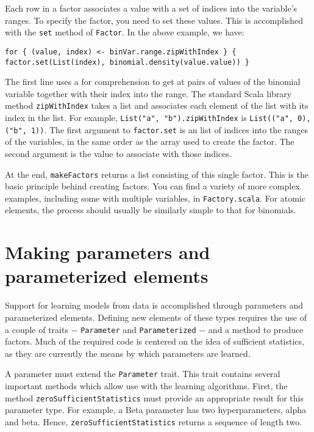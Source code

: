 Each row in a factor associates a value with a set of indices into the variable's ranges. To specify the factor, you need to set these values. This is accomplished with the \texttt{set} method of \texttt{Factor}. In the above example, we have:

\begin{flushleft}
\texttt{for \{ (value, index) <- binVar.range.zipWithIndex \} \{
\newline \tab factor.set(List(index), binomial.density(value.value))
\newline \}
}
\end{flushleft}

The first line uses a for comprehension to get at pairs of values of the binomial variable together with their index into the range. The standard Scala library method \texttt{zipWithIndex} takes a list and associates each element of the list with its index in the list. For example, \texttt{List("a", "b").zipWithIndex} is \texttt{List(("a", 0), ("b", 1))}. The first argument to \texttt{factor.set} is an list of indices into the ranges of the variables, in the same order as the array used to create the factor. The second argument is the value to associate with those indices.

At the end, \texttt{makeFactors} returns a list consisting of this single factor. This is the basic principle behind creating factors. You can find a variety of more complex examples, including some with multiple variables, in  \texttt{Factory.scala}. For atomic elements, the process should usually be similarly simple to that for binomials.

\section{Making parameters and parameterized elements}

Support for learning models from data is accomplished through parameters and parameterized elements. Defining new elements of these types requires the use of a couple of traits $-$ \texttt{Parameter} and \texttt{Parameter\-ized} $-$ and a method to produce factors. Much of the required code is centered on the idea of sufficient statistics, as they are currently the means by which parameters are learned. 

A parameter must extend the \texttt{Parameter} trait. This trait contains several important methods which allow use with the learning algorithms. First, the method \texttt{zeroSufficientStatistics} must provide an appropriate result for this parameter type. For example, a Beta parameter has two hyperparameters, alpha and beta. Hence, \texttt{zeroSuffic\-ientStatistics} returns a sequence of length two.

